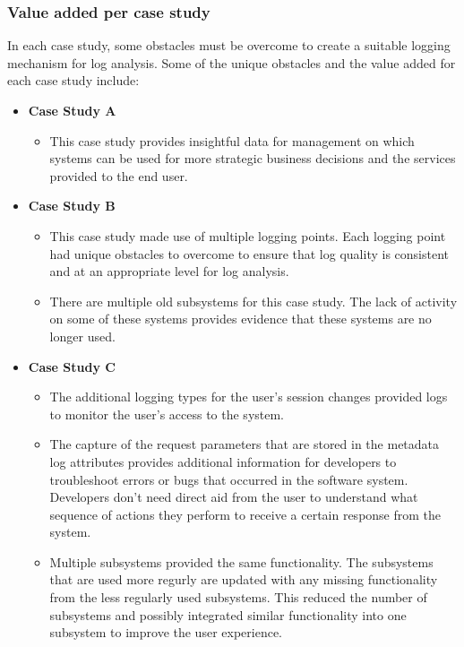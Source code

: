 \subsubsection{Value added per case study}
In each case study, some obstacles must be overcome to create a suitable logging mechanism for log analysis. Some of the unique obstacles and the value added for each case study include:

\begin{itemize}
	\item \textbf{Case Study A}
		\begin{itemize}
			\item This case study provides insightful data for management on which systems can be used for more strategic business decisions and the services provided to the end user.
		\end{itemize}
	\item \textbf{Case Study B}
	\begin{itemize}
		\item This case study made use of multiple logging points. Each logging point had unique obstacles to overcome to ensure that log quality is consistent and at an appropriate level for log analysis.
		\item There are multiple old subsystems for this case study. The lack of activity on some of these systems provides evidence that these systems are no longer used.
	\end{itemize}
	\item \textbf{Case Study C}
	\begin{itemize}
		\item The additional logging types for the user's session changes provided logs to monitor the user's access to the system.
		\item The capture of the request parameters that are stored in the metadata log attributes provides additional information for developers to troubleshoot errors or bugs that occurred in the software system. Developers don't need direct aid from the user to understand what sequence of actions they perform to receive a certain response from the system.
		\item Multiple subsystems provided the same functionality. The subsystems that are used more regurly are updated with any missing functionality from the less regularly used subsystems. This reduced the number of subsystems and possibly integrated similar functionality into one subsystem to improve the user experience. 
	\end{itemize}
\end{itemize}

